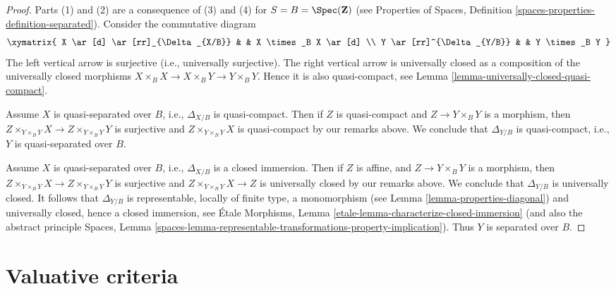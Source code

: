 \begin{proof}
Parts (1) and (2) are a consequence of (3) and (4) for
$S = B = \Spec(\mathbf{Z})$ (see
Properties of Spaces,
Definition \ref{spaces-properties-definition-separated}).
Consider the commutative diagram
$$
\xymatrix{
X \ar[d] \ar[rr]_{\Delta_{X/B}} & & X \times_B X \ar[d] \\
Y \ar[rr]^{\Delta_{Y/B}} & & Y \times_B Y
}
$$
The left vertical arrow is surjective (i.e., universally surjective).
The right vertical arrow is universally closed as a composition
of the universally closed morphisms
$X \times_B X \to X \times_B Y \to Y \times_B Y$. Hence it is also
quasi-compact, see
Lemma \ref{lemma-universally-closed-quasi-compact}.

\medskip\noindent
Assume $X$ is quasi-separated over $B$, i.e.,  $\Delta_{X/B}$ is
quasi-compact. Then if $Z$ is quasi-compact and $Z \to Y \times_B Y$ is
a morphism, then $Z \times_{Y \times_B Y} X \to Z \times_{Y \times_B Y} Y$
is surjective and $Z \times_{Y \times_B Y} X$ is quasi-compact by our remarks
above. We conclude that $\Delta_{Y/B}$ is quasi-compact, i.e., $Y$
is quasi-separated over $B$.

\medskip\noindent
Assume $X$ is quasi-separated over $B$, i.e.,  $\Delta_{X/B}$ is a closed
immersion. Then if $Z$ is affine, and $Z \to Y \times_B Y$ is
a morphism, then $Z \times_{Y \times_B Y} X \to Z \times_{Y \times_B Y} Y$
is surjective and $Z \times_{Y \times_B Y} X \to Z$ is universally closed
by our remarks above. We conclude that $\Delta_{Y/B}$ is universally closed.
It follows that $\Delta_{Y/B}$ is representable, locally of finite type, a
monomorphism (see
Lemma \ref{lemma-properties-diagonal})
and universally closed, hence a closed immersion, see
\'Etale Morphisms,
Lemma \ref{etale-lemma-characterize-closed-immersion}
(and also the abstract principle
Spaces, Lemma
\ref{spaces-lemma-representable-transformations-property-implication}).
Thus $Y$ is separated over $B$.
\end{proof}













\section{Valuative criteria}
\label{section-valuative}

